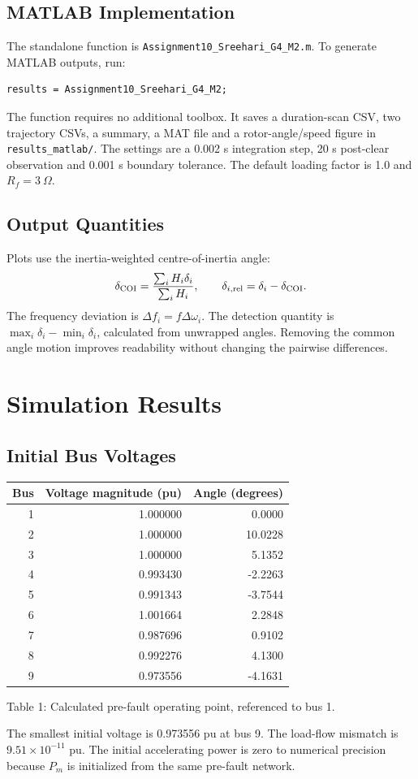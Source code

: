 \documentclass[11pt,a4paper]{article}
\newcommand{\captext}[1]{\begin{center}\small #1\end{center}}
\begin{document}
\subsection{MATLAB Implementation}
The standalone function is \texttt{Assignment10\_Sreehari\_G4\_M2.m}. To generate MATLAB outputs, run:
\begin{verbatim}
results = Assignment10_Sreehari_G4_M2;
\end{verbatim}
The function requires no additional toolbox. It saves a duration-scan CSV, two trajectory CSVs, a summary, a MAT file and a rotor-angle/speed figure in \texttt{results\_matlab/}. The settings are a 0.002 s integration step, 20 s post-clear observation and 0.001 s boundary tolerance. The default loading factor is 1.0 and $R_f=3\ \Omega$.
\subsection{Output Quantities}
Plots use the inertia-weighted centre-of-inertia angle:
\[\delta_{\rm COI}=\frac{\sum_iH_i\delta_i}{\sum_iH_i},\qquad
\delta_{i,\rm rel}=\delta_i-\delta_{\rm COI}.\]
The frequency deviation is $\Delta f_i=f\Delta\omega_i$. The detection quantity is $\max_i\delta_i-\min_i\delta_i$, calculated from unwrapped angles. Removing the common angle motion improves readability without changing the pairwise differences.
\newpage
\section{Simulation Results}
\subsection{Initial Bus Voltages}
\begin{center}\begin{tabular}{rrr}\toprule Bus&Voltage magnitude (pu)&Angle (degrees)\\\midrule
1 & 1.000000 & 0.0000 \\
2 & 1.000000 & 10.0228 \\
3 & 1.000000 & 5.1352 \\
4 & 0.993430 & -2.2263 \\
5 & 0.991343 & -3.7544 \\
6 & 1.001664 & 2.2848 \\
7 & 0.987696 & 0.9102 \\
8 & 0.992276 & 4.1300 \\
9 & 0.973556 & -4.1631 \\
\bottomrule\end{tabular}\end{center}
\captext{Table 1: Calculated pre-fault operating point, referenced to bus 1.}
The smallest initial voltage is 0.973556 pu at bus 9. The load-flow mismatch is $9.51\times10^{-11}$ pu. The initial accelerating power is zero to numerical precision because $P_m$ is initialized from the same pre-fault network.
\end{document}
